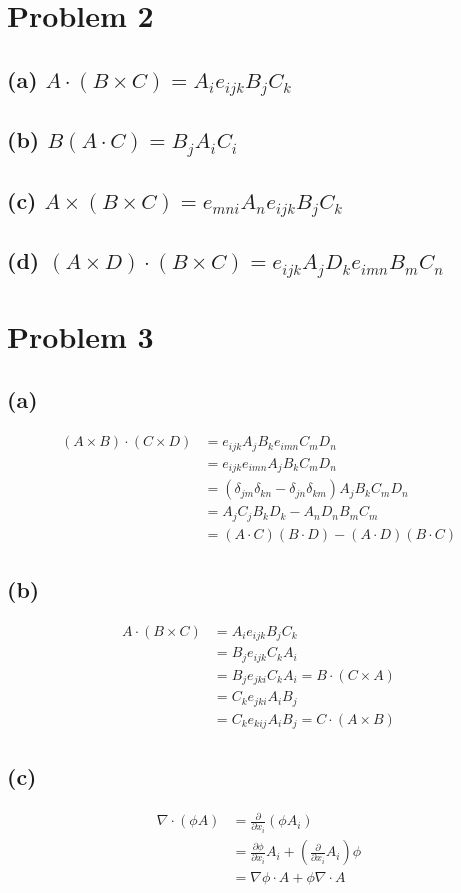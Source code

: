 \documentclass[12pt]{article}
\newcommand{\eq}[1]{\begin{align*}#1\end{align*}}
\begin{document}
\section*{Problem 2}
\subsection*{(a) $A\cdot(B\times C) = A_i e_{ijk}B_jC_k$}
\subsection*{(b) $B(A\cdot C) = B_jA_iC_i$}
\subsection*{(c) $A\times (B\times C) = e_{mni}A_n e_{ijk}B_jC_k$}
\subsection*{(d) $(A\times D) \cdot (B \times C) = e_{ijk}A_jD_ke_{imn}B_mC_n$}
\section*{Problem 3}
\subsection*{(a)}
\eq{
	(A\times B)\cdot(C \times D) &= e_{ijk}A_jB_k e_{imn}C_mD_n\\
	&= e_{ijk}e_{imn}A_jB_kC_mD_n\\
	&= \left(\delta_{jm}\delta_{kn} - \delta_{jn}\delta_{km}\right)A_jB_kC_mD_n\\
	&= A_jC_jB_kD_k - A_nD_nB_mC_m\\
	&= (A\cdot C)(B\cdot D) - (A\cdot D)(B\cdot C)
}
\subsection*{(b)}
\eq{
	A\cdot(B \times C) &= A_ie_{ijk}B_jC_k\\
	&= B_je_{ijk}C_kA_i\\
	&= B_je_{jki}C_kA_i = B\cdot(C \times A)\\
	&= C_ke_{jki}A_iB_j\\
	&= C_ke_{kij}A_iB_j = C\cdot(A \times B)
}
\subsection*{(c)}
\eq{
	\nabla\cdot(\phi A) &= \frac{\partial}{\partial x_i}(\phi A_i)\\
	&= \frac{\partial \phi}{\partial x_i} A_i + (\frac{\partial}{\partial x_i}A_i)\phi\\
	&= \nabla\phi \cdot A + \phi\nabla\cdot A
}
\end{document}
